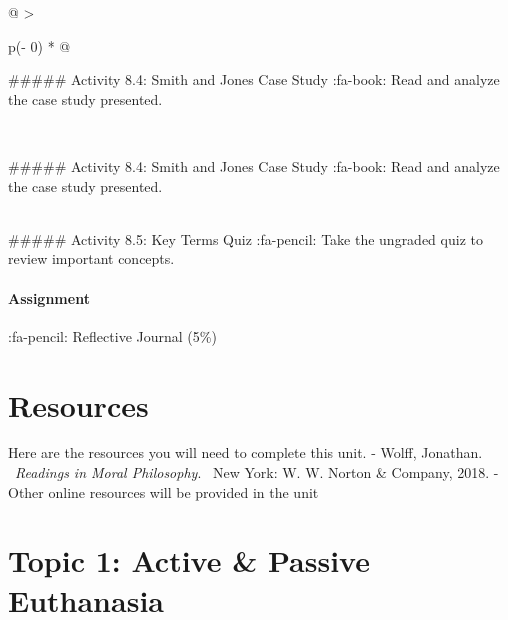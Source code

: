 \documentclass[
]{book}
\begin{document}
\begin{longtable}[]{@{}
  >{\raggedright\arraybackslash}p{(\columnwidth - 0\tabcolsep) * }@{}}
\caption{fa-book: Read the section on euthanasia by Hugo Adam Bedau (pages 397-406) in your \emph{Readings} textbook.}\tabularnewline
\toprule\noalign{}
\begin{minipage}[b]{\linewidth}\raggedright
\#\#\#\#\# Activity 8.4: Smith and Jones Case Study
:fa-book: Read and analyze the case study presented.
\end{minipage} \\
\midrule\noalign{}
\endfirsthead
\toprule\noalign{}
\begin{minipage}[b]{\linewidth}\raggedright
\#\#\#\#\# Activity 8.4: Smith and Jones Case Study
:fa-book: Read and analyze the case study presented.
\end{minipage} \\
\midrule\noalign{}
\endhead
\bottomrule\noalign{}
\endlastfoot
\#\#\#\#\# Activity 8.5: Key Terms Quiz
:fa-pencil: Take the ungraded quiz to review important concepts. \\
\end{longtable}

\hypertarget{assignment-5}{%
\paragraph{\texorpdfstring{\textbf{Assignment}}{Assignment}}\label{assignment-5}}

:fa-pencil: Reflective Journal (5\%)

\hypertarget{resources-7}{%
\section{Resources}\label{resources-7}}

Here are the resources you will need to complete this unit.
- Wolff, Jonathan. ~\emph{Readings in Moral Philosophy}. ~New York: W. W. Norton \& Company, 2018.
- Other online resources will be provided in the unit

\hypertarget{topic-1-active-passive-euthanasia}{%
\section{Topic 1: Active \& Passive Euthanasia}\label{topic-1-active-passive-euthanasia}}
\end{document}
